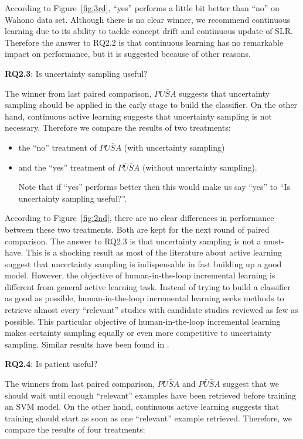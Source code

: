 \documentclass[final,twocolumn,5p]{elsarticle}
\theoremstyle{break}
\begin{document}
According to Figure~\ref{fig:3rd}, ``yes'' performs a little bit better than ``no'' on Wahono data set. Although there is no clear winner, we recommend continuous learning due to its ability to tackle concept drift and continuous update of SLR. Therefore the answer to RQ2.2 is that continuous learning has no remarkable impact on performance, but it is suggested because of other reasons.

\textbf{RQ2.3}: Is uncertainty sampling useful?

The winner from last paired comparison, $PU\bar{S}A$ suggests that uncertainty sampling should be applied in the early stage to build the classifier. On the other hand, continuous active learning suggests that uncertainty sampling is not necessary. Therefore we compare the results of two treatments:

\begin{itemize}
\item the ``no'' treatment of $PU\bar{S}A$ (with uncertainty sampling)
\item and the ``yes'' treatment of $P\bar{U}\bar{S}A$ (without uncertainty sampling). 

Note that if ``yes''
performs better then this would make us say ``yes'' to ``Is uncertainty sampling useful?''.
\end{itemize}

According to Figure~\ref{fig:2nd}, there are no clear differences in performance between these two treatments. Both are kept for the next round of paired comparison. The answer to RQ2.3 is that uncertainty sampling is not a must-have. This is a shocking result as most of the literature about active learning suggest that uncertainty sampling is indispensable in fast building up a good model. However, the objective of human-in-the-loop incremental learning is different from general active learning task. Instead of trying to build a classifier as good as possible, human-in-the-loop incremental learning seeks methods to retrieve almost every ``relevant'' studies with candidate studies reviewed as few as possible. This particular objective of human-in-the-loop incremental learning makes certainty sampling equally or even more competitive to uncertainty sampling. Similar results have been found in \cite{cormack2014evaluation}.

\textbf{RQ2.4}: Is patient useful?

The winners from last paired comparison, $PU\bar{S}A$ and $P\bar{U}\bar{S}A$ suggest that we should wait until enough ``relevant'' examples have been retrieved before training an SVM model. On the other hand, continuous active learning suggests that training should start as soon as
one ``relevant'' example retrieved. Therefore, we compare the results of four treatments:
\end{document}
